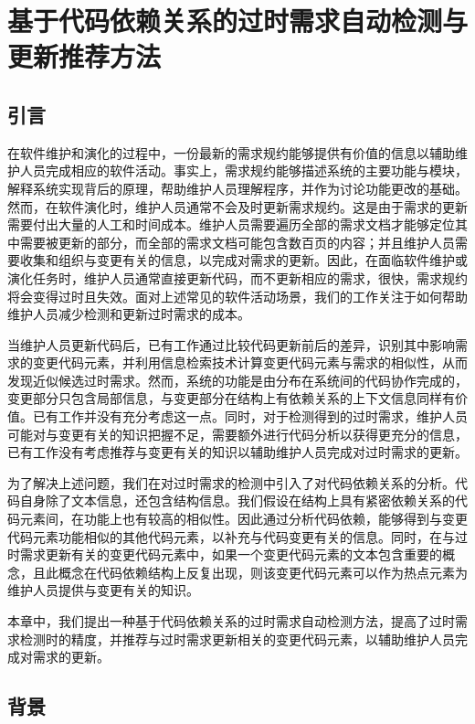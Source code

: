 \chapter{基于代码依赖关系的过时需求自动检测与更新推荐方法}

\section{引言}

在软件维护和演化的过程中，一份最新的需求规约能够提供有价值的信息以辅助维护人员完成相应的软件活动。事实上，需求规约能够描述系统的主要功能与模块，解释系统实现背后的原理，帮助维护人员理解程序，并作为讨论功能更改的基础。然而，在软件演化时，维护人员通常不会及时更新需求规约。这是由于需求的更新需要付出大量的人工和时间成本。维护人员需要遍历全部的需求文档才能够定位其中需要被更新的部分，而全部的需求文档可能包含数百页的内容；并且维护人员需要收集和组织与变更有关的信息，以完成对需求的更新。因此，在面临软件维护或演化任务时，维护人员通常直接更新代码，而不更新相应的需求，很快，需求规约将会变得过时且失效。面对上述常见的软件活动场景，我们的工作关注于如何帮助维护人员减少检测和更新过时需求的成本。

当维护人员更新代码后，已有工作通过比较代码更新前后的差异，识别其中影响需求的变更代码元素，并利用信息检索技术计算变更代码元素与需求的相似性，从而发现近似候选过时需求。然而，系统的功能是由分布在系统间的代码协作完成的，变更部分只包含局部信息，与变更部分在结构上有依赖关系的上下文信息同样有价值。已有工作并没有充分考虑这一点。同时，对于检测得到的过时需求，维护人员可能对与变更有关的知识把握不足，需要额外进行代码分析以获得更充分的信息，已有工作没有考虑推荐与变更有关的知识以辅助维护人员完成对过时需求的更新。

为了解决上述问题，我们在对过时需求的检测中引入了对代码依赖关系的分析。代码自身除了文本信息，还包含结构信息。我们假设在结构上具有紧密依赖关系的代码元素间，在功能上也有较高的相似性。因此通过分析代码依赖，能够得到与变更代码元素功能相似的其他代码元素，以补充与代码变更有关的信息。同时，在与过时需求更新有关的变更代码元素中，如果一个变更代码元素的文本包含重要的概念，且此概念在代码依赖结构上反复出现，则该变更代码元素可以作为热点元素为维护人员提供与变更有关的知识。 

本章中，我们提出一种基于代码依赖关系的过时需求自动检测方法，提高了过时需求检测时的精度，并推荐与过时需求更新相关的变更代码元素，以辅助维护人员完成对需求的更新。

\section{背景}

